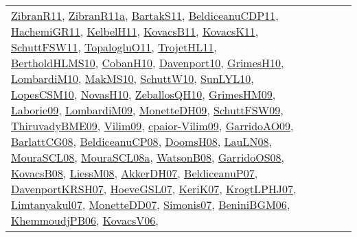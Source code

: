 {\begin{longtable}{lp{3cm}>{\raggedright}p{6cm}>{\raggedright}p{6cm}p{8cm}}
\href{papers/ZibranR11.pdf}{ZibranR11}\cite{ZibranR11}, \href{papers/ZibranR11a.pdf}{ZibranR11a}\cite{ZibranR11a}, \href{articles/BartakS11.pdf}{BartakS11}\cite{BartakS11}, \href{articles/BeldiceanuCDP11.pdf}{BeldiceanuCDP11}\cite{BeldiceanuCDP11}, \href{articles/HachemiGR11.pdf}{HachemiGR11}\cite{HachemiGR11}, \href{articles/KelbelH11.pdf}{KelbelH11}\cite{KelbelH11}, \href{articles/KovacsB11.pdf}{KovacsB11}\cite{KovacsB11}, \href{articles/KovacsK11.pdf}{KovacsK11}\cite{KovacsK11}, \href{articles/SchuttFSW11.pdf}{SchuttFSW11}\cite{SchuttFSW11}, \href{articles/TopalogluO11.pdf}{TopalogluO11}\cite{TopalogluO11}, \href{articles/TrojetHL11.pdf}{TrojetHL11}\cite{TrojetHL11}, \href{papers/BertholdHLMS10.pdf}{BertholdHLMS10}\cite{BertholdHLMS10}, \href{papers/CobanH10.pdf}{CobanH10}\cite{CobanH10}, \href{papers/Davenport10.pdf}{Davenport10}\cite{Davenport10}, \href{papers/GrimesH10.pdf}{GrimesH10}\cite{GrimesH10}, \href{papers/LombardiM10.pdf}{LombardiM10}\cite{LombardiM10}, \href{papers/MakMS10.pdf}{MakMS10}\cite{MakMS10}, \href{papers/SchuttW10.pdf}{SchuttW10}\cite{SchuttW10}, \href{papers/SunLYL10.pdf}{SunLYL10}\cite{SunLYL10}, \href{articles/LopesCSM10.pdf}{LopesCSM10}\cite{LopesCSM10}, \href{articles/NovasH10.pdf}{NovasH10}\cite{NovasH10}, \href{articles/ZeballosQH10.pdf}{ZeballosQH10}\cite{ZeballosQH10}, \href{papers/GrimesHM09.pdf}{GrimesHM09}\cite{GrimesHM09}, \href{papers/Laborie09.pdf}{Laborie09}\cite{Laborie09}, \href{papers/LombardiM09.pdf}{LombardiM09}\cite{LombardiM09}, \href{papers/MonetteDH09.pdf}{MonetteDH09}\cite{MonetteDH09}, \href{papers/SchuttFSW09.pdf}{SchuttFSW09}\cite{SchuttFSW09}, \href{papers/ThiruvadyBME09.pdf}{ThiruvadyBME09}\cite{ThiruvadyBME09}, \href{papers/Vilim09.pdf}{Vilim09}\cite{Vilim09}, \href{papers/cpaior-Vilim09.pdf}{cpaior-Vilim09}\cite{cpaior-Vilim09}, \href{articles/GarridoAO09.pdf}{GarridoAO09}\cite{GarridoAO09}, \href{papers/BarlattCG08.pdf}{BarlattCG08}\cite{BarlattCG08}, \href{papers/BeldiceanuCP08.pdf}{BeldiceanuCP08}\cite{BeldiceanuCP08}, \href{papers/DoomsH08.pdf}{DoomsH08}\cite{DoomsH08}, \href{papers/LauLN08.pdf}{LauLN08}\cite{LauLN08}, \href{papers/MouraSCL08.pdf}{MouraSCL08}\cite{MouraSCL08}, \href{papers/MouraSCL08a.pdf}{MouraSCL08a}\cite{MouraSCL08a}, \href{papers/WatsonB08.pdf}{WatsonB08}\cite{WatsonB08}, \href{articles/GarridoOS08.pdf}{GarridoOS08}\cite{GarridoOS08}, \href{articles/KovacsB08.pdf}{KovacsB08}\cite{KovacsB08}, \href{articles/LiessM08.pdf}{LiessM08}\cite{LiessM08}, \href{papers/AkkerDH07.pdf}{AkkerDH07}\cite{AkkerDH07}, \href{papers/BeldiceanuP07.pdf}{BeldiceanuP07}\cite{BeldiceanuP07}, \href{papers/DavenportKRSH07.pdf}{DavenportKRSH07}\cite{DavenportKRSH07}, \href{papers/HoeveGSL07.pdf}{HoeveGSL07}\cite{HoeveGSL07}, \href{papers/KeriK07.pdf}{KeriK07}\cite{KeriK07}, \href{papers/KrogtLPHJ07.pdf}{KrogtLPHJ07}\cite{KrogtLPHJ07}, \href{papers/Limtanyakul07.pdf}{Limtanyakul07}\cite{Limtanyakul07}, \href{papers/MonetteDD07.pdf}{MonetteDD07}\cite{MonetteDD07}, \href{articles/Simonis07.pdf}{Simonis07}\cite{Simonis07}, \href{papers/BeniniBGM06.pdf}{BeniniBGM06}\cite{BeniniBGM06}, \href{papers/KhemmoudjPB06.pdf}{KhemmoudjPB06}\cite{KhemmoudjPB06}, \href{papers/KovacsV06.pdf}{KovacsV06}\cite{KovacsV06}, 
\end{longtable}}
